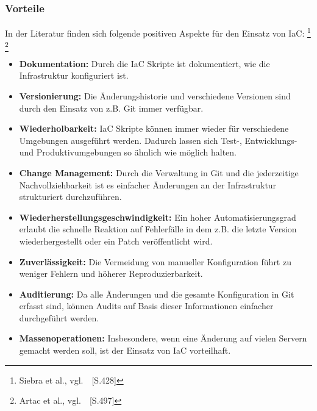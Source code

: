\subsubsection{Vorteile}\label{iac_vorteile}

In der Literatur finden sich folgende positiven Aspekte für den Einsatz von IaC:
\footnote{Siebra et al., vgl.~\cite{Siebra2019}~[S.428]}
\footnote{Artac et al., vgl.~\cite{Artac2017}~[S.497]}

\begin{itemize}
    \item \textbf{Dokumentation:}
    Durch die IaC Skripte ist dokumentiert, wie die Infrastruktur konfiguriert ist.

    \item \textbf{Versionierung:}
    Die Änderungshistorie und verschiedene Versionen sind durch den Einsatz von z.B. Git immer verfügbar.

    \item \textbf{Wiederholbarkeit:}
    IaC Skripte können immer wieder für verschiedene Umgebungen ausgeführt werden.
    Dadurch lassen sich Test-, Entwicklungs- und Produktivumgebungen so ähnlich wie möglich halten.

    \item \textbf{Change Management:}
    Durch die Verwaltung in Git und die jederzeitige Nachvollziehbarkeit ist es einfacher Änderungen an der Infrastruktur strukturiert durchzuführen.

    \item \textbf{Wiederherstellungsgeschwindigkeit:}
    Ein hoher Automatisierungsgrad erlaubt die schnelle Reaktion auf Fehlerfälle in dem z.B. die letzte Version wiederhergestellt oder ein Patch veröffentlicht wird.

    \item \textbf{Zuverlässigkeit:}
    Die Vermeidung von manueller Konfiguration führt zu weniger Fehlern und höherer Reproduzierbarkeit.

    \item \textbf{Auditierung:}
    Da alle Änderungen und die gesamte Konfiguration in Git erfasst sind, können Audits auf Basis dieser Informationen einfacher durchgeführt werden.

    \item \textbf{Massenoperationen:}
    Insbesondere, wenn eine Änderung auf vielen Servern gemacht werden soll, ist der Einsatz von IaC vorteilhaft.
\end{itemize}
